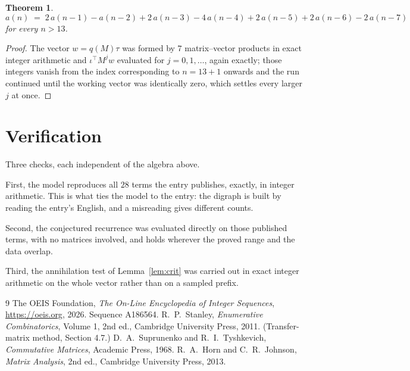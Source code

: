 \documentclass[11pt,a4paper]{article}
\theoremstyle{plain}
\newtheorem{theorem}{Theorem}
\theoremstyle{definition}
\begin{document}
\begin{theorem}
\[
a(n)\;=\;2\,a(n-1) - a(n-2) + 2\,a(n-3) - 4\,a(n-4) + 2\,a(n-5) + 2\,a(n-6) - 2\,a(n-7)
\]
for every $n>13$.
\end{theorem}

\begin{proof}
The vector $w=q(M)\tau$ was formed by $7$ matrix--vector products in exact integer
arithmetic and $\iota^{\!\top}M^{j}w$ evaluated for $j=0,1,\dots$, again exactly; those
integers vanish from the index corresponding to $n=13+1$ onwards and the run continued
until the working vector was identically zero, which settles every larger $j$ at once.
\end{proof}

\section{Verification}

Three checks, each independent of the algebra above.

First, the model reproduces all $28$ terms the entry publishes, exactly, in integer
arithmetic. This is what ties the model to the entry: the digraph is built by reading the
entry's English, and a misreading gives different counts.

Second, the conjectured recurrence was evaluated directly on those published terms, with no
matrices involved, and holds wherever the proved range and the data overlap.

Third, the annihilation test of Lemma~\ref{lem:crit} was carried out in exact integer
arithmetic on the whole vector rather than on a sampled prefix.

\begin{thebibliography}{9}
 The OEIS Foundation, \emph{The On-Line Encyclopedia of Integer
Sequences}, \url{https://oeis.org}, 2026. Sequence A186564.
 R.~P.~Stanley, \emph{Enumerative Combinatorics}, Volume 1, 2nd ed.,
Cambridge University Press, 2011. (Transfer-matrix method, Section 4.7.)
 D.~A.~Suprunenko and R.~I.~Tyshkevich, \emph{Commutative Matrices},
Academic Press, 1968.
 R.~A.~Horn and C.~R.~Johnson, \emph{Matrix Analysis}, 2nd ed., Cambridge
University Press, 2013.
\end{thebibliography}
\end{document}
